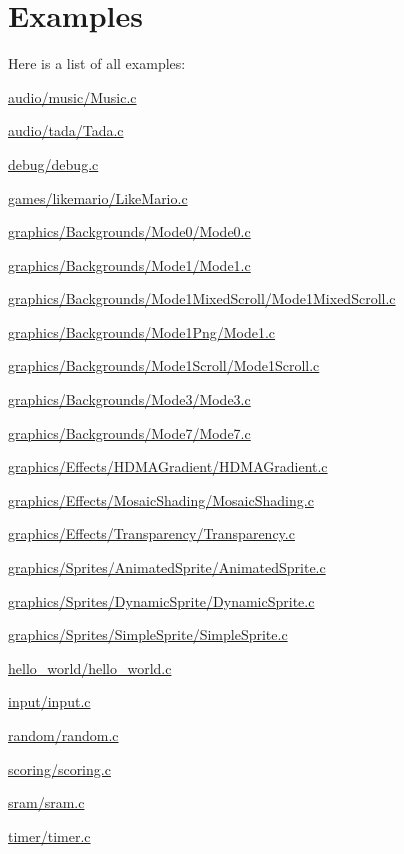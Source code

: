 \section{Examples}
Here is a list of all examples\+:\begin{DoxyCompactItemize}
\item 
\hyperlink{a00437}{audio/music/\+Music.\+c}
\item 
\hyperlink{a00439}{audio/tada/\+Tada.\+c}
\item 
\hyperlink{a00441}{debug/debug.\+c}
\item 
\hyperlink{a00435}{games/likemario/\+Like\+Mario.\+c}
\item 
\hyperlink{a00405}{graphics/\+Backgrounds/\+Mode0/\+Mode0.\+c}
\item 
\hyperlink{a00407}{graphics/\+Backgrounds/\+Mode1/\+Mode1.\+c}
\item 
\hyperlink{a00413}{graphics/\+Backgrounds/\+Mode1\+Mixed\+Scroll/\+Mode1\+Mixed\+Scroll.\+c}
\item 
\hyperlink{a00409}{graphics/\+Backgrounds/\+Mode1\+Png/\+Mode1.\+c}
\item 
\hyperlink{a00411}{graphics/\+Backgrounds/\+Mode1\+Scroll/\+Mode1\+Scroll.\+c}
\item 
\hyperlink{a00415}{graphics/\+Backgrounds/\+Mode3/\+Mode3.\+c}
\item 
\hyperlink{a00417}{graphics/\+Backgrounds/\+Mode7/\+Mode7.\+c}
\item 
\hyperlink{a00419}{graphics/\+Effects/\+H\+D\+M\+A\+Gradient/\+H\+D\+M\+A\+Gradient.\+c}
\item 
\hyperlink{a00421}{graphics/\+Effects/\+Mosaic\+Shading/\+Mosaic\+Shading.\+c}
\item 
\hyperlink{a00423}{graphics/\+Effects/\+Transparency/\+Transparency.\+c}
\item 
\hyperlink{a00427}{graphics/\+Sprites/\+Animated\+Sprite/\+Animated\+Sprite.\+c}
\item 
\hyperlink{a00429}{graphics/\+Sprites/\+Dynamic\+Sprite/\+Dynamic\+Sprite.\+c}
\item 
\hyperlink{a00425}{graphics/\+Sprites/\+Simple\+Sprite/\+Simple\+Sprite.\+c}
\item 
\hyperlink{a00403}{hello\+\_\+world/hello\+\_\+world.\+c}
\item 
\hyperlink{a00431}{input/input.\+c}
\item 
\hyperlink{a00443}{random/random.\+c}
\item 
\hyperlink{a00447}{scoring/scoring.\+c}
\item 
\hyperlink{a00445}{sram/sram.\+c}
\item 
\hyperlink{a00433}{timer/timer.\+c}
\end{DoxyCompactItemize}

